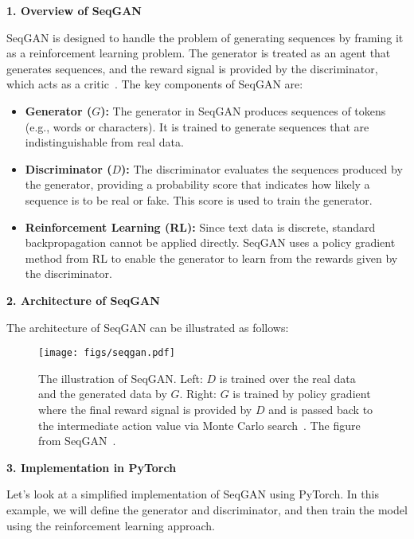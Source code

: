 \textbf{1. Overview of SeqGAN}

SeqGAN is designed to handle the problem of generating sequences by framing it as a reinforcement learning problem. The generator is treated as an agent that generates sequences, and the reward signal is provided by the discriminator, which acts as a critic~\cite{yu2017seqgan}. The key components of SeqGAN are:
\begin{itemize}
    \item \textbf{Generator ($G$):} The generator in SeqGAN produces sequences of tokens (e.g., words or characters). It is trained to generate sequences that are indistinguishable from real data.
    \item \textbf{Discriminator ($D$):} The discriminator evaluates the sequences produced by the generator, providing a probability score that indicates how likely a sequence is to be real or fake. This score is used to train the generator.
    \item \textbf{Reinforcement Learning (RL):} Since text data is discrete, standard backpropagation cannot be applied directly. SeqGAN uses a policy gradient method from RL to enable the generator to learn from the rewards given by the discriminator.
\end{itemize}

\textbf{2. Architecture of SeqGAN}

The architecture of SeqGAN can be illustrated as follows:
\begin{figure}[htbp]
    \centering
    \texttt{[image: figs/seqgan.pdf]}
    \caption{The illustration of SeqGAN. Left: $D$ is trained over the real data and the generated data by $G$. Right: $G$ is trained by policy gradient where the final reward signal is provided by $D$ and is passed back to the intermediate action value via Monte Carlo search~\cite{browne2012survey}. The figure from SeqGAN~\cite{yu2017seqgan}.}
\end{figure}

\textbf{3. Implementation in PyTorch}

Let's look at a simplified implementation of SeqGAN using PyTorch. In this example, we will define the generator and discriminator, and then train the model using the reinforcement learning approach.

